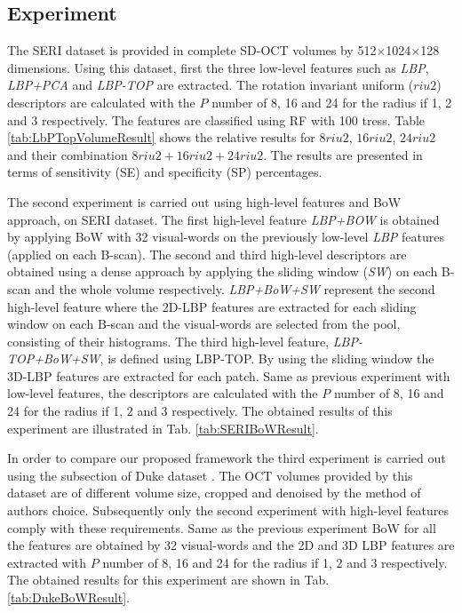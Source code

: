 \subsection{Experiment}
The SERI dataset is provided in complete SD-OCT volumes by 512$\times$1024$\times$128 dimensions. Using this dataset, first the three low-level features such as \textit{LBP}, \textit{LBP+PCA} and \textit{LBP-TOP} are extracted. The rotation invariant uniform ($riu2$) descriptors are calculated with the $P$ number of 8, 16 and 24 for the radius if 1, 2 and 3 respectively. The features are classified using RF with 100 tress. Table \ref{tab:LbPTopVolumeResult} shows the relative results for $8riu2$, $16riu2$, $24riu2$ and their combination $8riu2 + 16riu2 + 24riu2$. The results are presented in terms of sensitivity (SE) and specificity (SP) percentages.  

The second experiment is carried out using high-level features and BoW approach, on SERI dataset. The first high-level feature \textit{LBP+BOW} is obtained by applying BoW with 32 visual-words on the previously low-level \textit{LBP} features (applied on each B-scan). The second and third high-level descriptors are obtained using a dense approach by applying the sliding window (\textit{SW}) on each B-scan and the whole volume respectively. \textit{LBP+BoW+SW} represent the second high-level feature where the 2D-LBP features are extracted for each sliding window on each B-scan and the visual-words are selected from the pool, consisting of their histograms. The third high-level feature, \textit{LBP-TOP+BoW+SW}, is defined using LBP-TOP. By using the sliding window the 3D-LBP features are extracted for each patch. Same as previous experiment with low-level features, the descriptors are calculated with the $P$ number of 8, 16 and 24 for the radius if 1, 2 and 3 respectively. The obtained results of this experiment are illustrated in Tab. \ref{tab:SERIBoWResult}. 

In order to compare our proposed framework the third experiment is carried out using the subsection of Duke dataset \cite{Srinivasan2014}. The OCT volumes provided by this dataset are of different volume size, cropped and denoised by the method of authors choice. Subsequently only the second experiment with high-level features comply with these requirements. Same as the previous experiment BoW for all the features are obtained by 32 visual-words and the 2D and 3D LBP features are extracted with $P$ number of 8, 16 and 24 for the radius if 1, 2 and 3 respectively. The obtained results for this experiment are shown in Tab. \ref{tab:DukeBoWResult}.

